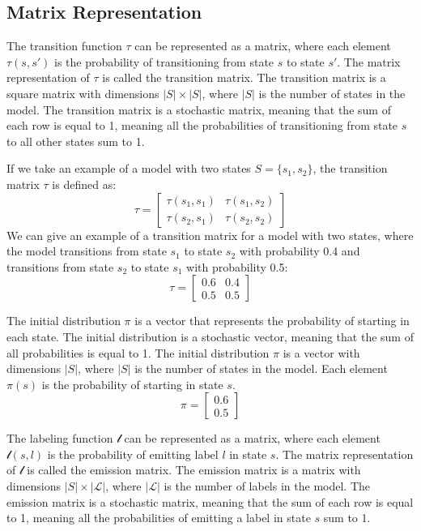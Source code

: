 \subsection{Matrix Representation}
The transition function $\tau$ can be represented as a matrix, where each element $\tau(s, s')$ is the probability of transitioning from state $s$ to state $s'$. The matrix representation of $\tau$ is called the transition matrix. The transition matrix is a square matrix with dimensions $|S| \times |S|$, where $|S|$ is the number of states in the model. The transition matrix is a stochastic matrix, meaning that the sum of each row is equal to 1, meaning all the probabilities of transitioning from state $s$ to all other states sum to 1.

If we take an example of a model with two states $S = \{s_1, s_2\}$, the transition matrix $\tau$ is defined as:
\begin{equation}
    \tau = \begin{bmatrix}
        \tau(s_1, s_1) & \tau(s_1, s_2) \\
        \tau(s_2, s_1) & \tau(s_2, s_2)
    \end{bmatrix}
\end{equation}
We can give an example of a transition matrix for a model with two states, where the model transitions from state $s_1$ to state $s_2$ with probability 0.4 and transitions from state $s_2$ to state $s_1$ with probability 0.5:
\begin{equation}
    \tau = \begin{bmatrix}
        0.6 & 0.4 \\
        0.5 & 0.5
    \end{bmatrix}
\end{equation}

The initial distribution $\pi$ is a vector that represents the probability of starting in each state. The initial distribution is a stochastic vector, meaning that the sum of all probabilities is equal to 1. The initial distribution $\pi$ is a vector with dimensions $|S|$, where $|S|$ is the number of states in the model. Each element $\pi(s)$ is the probability of starting in state $s$.
\begin{equation}
    \pi = \begin{bmatrix}
        0.6 \\
        0.5
    \end{bmatrix}
\end{equation}

The labeling function $\mathcal{l}$ can be represented as a matrix, where each element $\mathcal{l}(s, l)$ is the probability of emitting label $l$ in state $s$. The matrix representation of $\mathcal{l}$ is called the emission matrix. The emission matrix is a matrix with dimensions $|S| \times |\mathcal{L}|$, where $|\mathcal{L}|$ is the number of labels in the model. The emission matrix is a stochastic matrix, meaning that the sum of each row is equal to 1, meaning all the probabilities of emitting a label in state $s$ sum to 1. 

